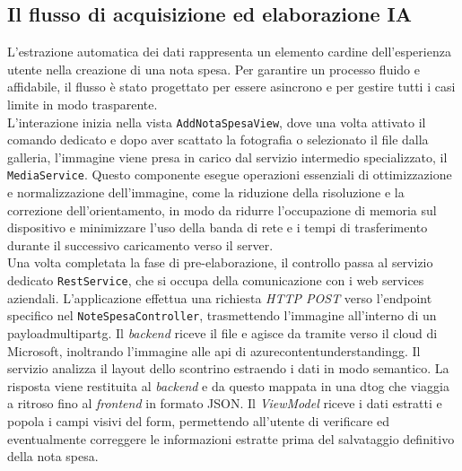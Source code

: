 \subsection*{Il flusso di acquisizione ed elaborazione IA}
\noindent L'estrazione automatica dei dati rappresenta un elemento cardine dell'esperienza utente nella creazione di una nota spesa. Per garantire un processo fluido e affidabile, il flusso è stato progettato per essere asincrono e per gestire tutti i casi limite in modo trasparente.\\
L'interazione inizia nella vista \texttt{AddNotaSpesaView}, dove una volta attivato il comando dedicato e dopo aver scattato la fotografia o selezionato il file dalla galleria, l'immagine viene presa in carico dal servizio intermedio specializzato, il \texttt{MediaService}. Questo componente esegue operazioni essenziali di ottimizzazione e normalizzazione dell'immagine, come la riduzione della risoluzione e la correzione dell'orientamento, in modo da ridurre l'occupazione di memoria sul dispositivo e minimizzare l'uso della banda di rete e i tempi di trasferimento durante il successivo caricamento verso il server.\\
Una volta completata la fase di pre-elaborazione, il controllo passa al servizio dedicato \texttt{RestService}, che si occupa della comunicazione con i web services aziendali. L'applicazione effettua una richiesta \textit{HTTP POST} verso l'endpoint specifico nel \texttt{NoteSpesaController}, trasmettendo l'immagine all'interno di un \gls{payloadmultipartg}. Il \textit{backend} riceve il file e agisce da tramite verso il cloud di Microsoft, inoltrando l'immagine alle \gls{api} di \gls{azurecontentunderstandingg}. Il servizio  analizza il layout dello scontrino estraendo i dati in modo semantico. La risposta viene restituita al \textit{backend} e da questo mappata in una \gls{dtog} che viaggia a ritroso fino al \textit{frontend} in formato JSON. Il \textit{ViewModel} riceve i dati estratti e popola i campi visivi del form, permettendo all'utente di verificare ed eventualmente correggere le informazioni estratte prima del salvataggio definitivo della nota spesa.

